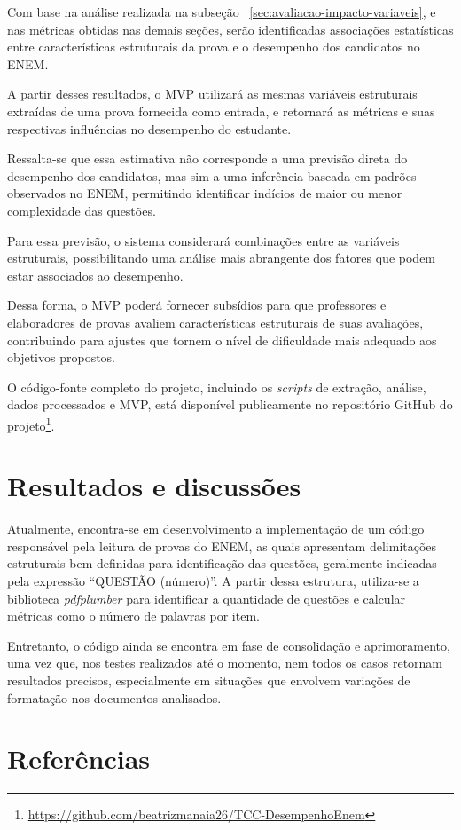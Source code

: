 \documentclass[a4paper,10pt, twocolumn]{article}
\begin{document}
Com base na análise realizada na subseção ~\ref{sec:avaliacao-impacto-variaveis}, e nas métricas obtidas nas demais seções, serão identificadas associações estatísticas entre características estruturais da prova e o desempenho dos candidatos no ENEM.

A partir desses resultados, o MVP utilizará as mesmas variáveis estruturais extraídas de uma prova fornecida como entrada, e retornará as métricas e suas respectivas influências no desempenho do estudante.

Ressalta-se que essa estimativa não corresponde a uma previsão direta do desempenho dos candidatos, mas sim a uma inferência baseada em padrões observados no ENEM, permitindo identificar indícios de maior ou menor complexidade das questões.

Para essa previsão, o sistema considerará combinações entre as variáveis estruturais, possibilitando uma análise mais abrangente dos fatores que podem estar associados ao desempenho.

Dessa forma, o MVP poderá fornecer subsídios para que professores e elaboradores de provas avaliem características estruturais de suas avaliações, contribuindo para ajustes que tornem o nível de dificuldade mais adequado aos objetivos propostos.

O código-fonte completo do projeto, incluindo os \textit{scripts} de extração, análise, dados processados e MVP, está disponível publicamente no repositório GitHub do projeto\footnote{\url{https://github.com/beatrizmanaia26/TCC-DesempenhoEnem}}.
\section{Resultados e discussões}  %
Atualmente, encontra-se em desenvolvimento a implementação de um código responsável pela leitura de provas do ENEM, as quais apresentam delimitações estruturais bem definidas para identificação das questões, geralmente indicadas pela expressão “QUESTÃO (número)”. A partir dessa estrutura, utiliza-se a biblioteca \textit{pdfplumber} para identificar a quantidade de questões e calcular métricas como o número de palavras por item.

Entretanto, o código ainda se encontra em fase de consolidação e aprimoramento, uma vez que, nos testes realizados até o momento, nem todos os casos retornam resultados precisos, especialmente em situações que envolvem variações de formatação nos documentos analisados.

\section{Referências}
\printbibliography[heading=none]
\end{document}
